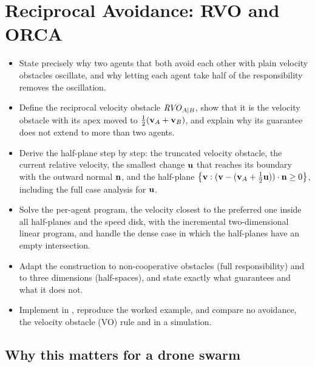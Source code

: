 \chapter{Reciprocal Avoidance: RVO and ORCA}
\label{ch:ch13}

\begin{objectives}
\begin{itemize}
  \item State precisely why two agents that both avoid each other with plain velocity obstacles oscillate, and why letting each agent take half of the responsibility removes the oscillation.
  \item Define the reciprocal velocity obstacle $\mathit{RVO}_{A|B}$, show that it is the velocity obstacle with its apex moved to $\tfrac12(\mathbf{v}_A + \mathbf{v}_B)$, and explain why its guarantee does not extend to more than two agents.
  \item Derive the \orca half-plane step by step: the truncated velocity obstacle, the current relative velocity, the smallest change $\mathbf{u}$ that reaches its boundary with the outward normal $\mathbf{n}$, and the half-plane $\left\{ \mathbf{v} : (\mathbf{v} - (\mathbf{v}_A + \tfrac12\mathbf{u}))\cdot\mathbf{n} \ge 0 \right\}$, including the full case analysis for $\mathbf{u}$.
  \item Solve the per-agent program, the velocity closest to the preferred one inside all half-planes and the speed disk, with the incremental two-dimensional linear program, and handle the dense case in which the half-planes have an empty intersection.
  \item Adapt the construction to non-cooperative obstacles (full responsibility) and to three dimensions (half-spaces), and state exactly what \orca guarantees and what it does not.
  \item Implement \orca in \python, reproduce the worked example, and compare no avoidance, the velocity obstacle (VO) rule and \orca in a simulation.
\end{itemize}
\end{objectives}

\section{Why this matters for a drone swarm}
\label{sec:ch13-motivation}

